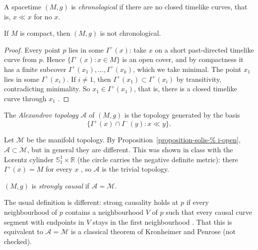 \begin{definition}
\label{definition-solis-chronological}
A spacetime $(M,g)$ is
\emph{chronological} if there are no
closed timelike curves, that is, $x\ll x$
for no $x$.
\end{definition}

\begin{proposition}
\label{proposition-solis-compact}
If $M$ is compact, then $(M,g)$ is not
chronological.
\end{proposition}

\begin{proof}
Every point $p$ lies in some $I^+(x)$:
take $x$ on a short past-directed
timelike curve from $p$. Hence
$\{I^+(x):x\in M\}$ is an open cover, and
by compactness it has a finite subcover
$I^+(x_1),\ldots,I^+(x_k)$, which we take
minimal. The point $x_1$ lies in some
$I^+(x_i)$. If $i\neq 1$, then
$I^+(x_1)\subset I^+(x_i)$ by
transitivity, contradicting minimality.
So $x_1\in I^+(x_1)$, that is, there is a
closed timelike curve through $x_1$
\cite[Lemma 14.10]{oneill}.
\end{proof}

\begin{definition}
\label{definition-solis-alexandrov}
The \emph{Alexandrov topology}
$\mathcal{A}$ of $(M,g)$ is the topology
generated by the basis
$$
\{I^+(x)\cap I^-(y):x\ll y\}.
$$
\end{definition}

\begin{remark}
\label{remark-solis-alexandrov}
Let $\mathcal{M}$ be the manifold topology.
By Proposition~\ref{proposition-solis-%
i-open},
$\mathcal{A}\subset\mathcal{M}$, but in
general they are different. This was
shown in class with the Lorentz cylinder
$\mathbb{S}^1_1\times\mathbb{R}$ (the
circle carries the negative definite
metric): there $I^+(x)=M$ for every $x$
\cite[p.~402]{oneill}, so $\mathcal{A}$ is
the trivial topology.
\end{remark}

\begin{definition}
\label{definition-solis-strongly-causal}
$(M,g)$ is \emph{strongly causal} if
$\mathcal{A}=\mathcal{M}$.
\end{definition}

\noindent
The usual definition is different: strong
causality holds at $p$ if every
neighbourhood of $p$ contains a
neighbourhood $V$ of $p$ such that every
causal curve segment with endpoints in $V$
stays in the first neighbourhood
\cite[Definition 14.11]{oneill}. That this
is equivalent to $\mathcal{A}=\mathcal{M}$
is a classical theorem of Kronheimer and
Penrose (not checked).


